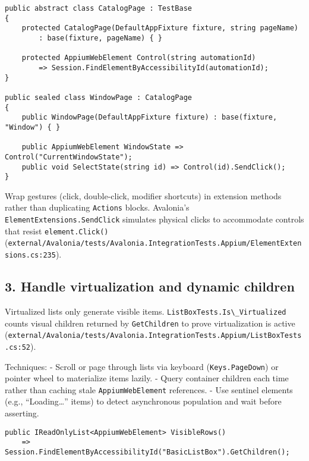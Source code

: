 \begin{lstlisting}
public abstract class CatalogPage : TestBase
{
    protected CatalogPage(DefaultAppFixture fixture, string pageName)
        : base(fixture, pageName) { }

    protected AppiumWebElement Control(string automationId)
        => Session.FindElementByAccessibilityId(automationId);
}

public sealed class WindowPage : CatalogPage
{
    public WindowPage(DefaultAppFixture fixture) : base(fixture, "Window") { }

    public AppiumWebElement WindowState => Control("CurrentWindowState");
    public void SelectState(string id) => Control(id).SendClick();
}
\end{lstlisting}

Wrap gestures (click, double-click, modifier shortcuts) in extension
methods rather than duplicating \passthrough{\lstinline!Actions!}
blocks. Avalonia's \passthrough{\lstinline!ElementExtensions.SendClick!}
simulates physical clicks to accommodate controls that resist
\passthrough{\lstinline!element.Click()!}
(\passthrough{\lstinline!external/Avalonia/tests/Avalonia.IntegrationTests.Appium/ElementExtensions.cs:235!}).

\subsection{3. Handle virtualization and dynamic
children}\label{handle-virtualization-and-dynamic-children}

Virtualized lists only generate visible items.
\passthrough{\lstinline!ListBoxTests.Is\_Virtualized!} counts visual
children returned by \passthrough{\lstinline!GetChildren!} to prove
virtualization is active
(\passthrough{\lstinline!external/Avalonia/tests/Avalonia.IntegrationTests.Appium/ListBoxTests.cs:52!}).

Techniques: - Scroll or page through lists via keyboard
(\passthrough{\lstinline!Keys.PageDown!}) or pointer wheel to
materialize items lazily. - Query container children each time rather
than caching stale \passthrough{\lstinline!AppiumWebElement!}
references. - Use sentinel elements (e.g., ``Loading\ldots'' items) to
detect asynchronous population and wait before asserting.

\begin{lstlisting}
public IReadOnlyList<AppiumWebElement> VisibleRows()
    => Session.FindElementByAccessibilityId("BasicListBox").GetChildren();
\end{lstlisting}

